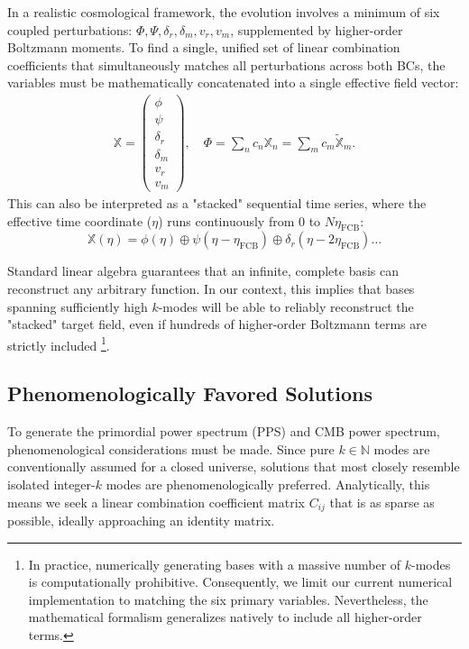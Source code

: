 In a realistic cosmological framework, the evolution involves a minimum of six coupled perturbations: $\Phi, \Psi, \delta_r, \delta_m, v_r, v_m$, supplemented by higher-order Boltzmann moments. To find a single, unified set of linear combination coefficients that simultaneously matches all perturbations across both BCs, the variables must be mathematically concatenated into a single effective field vector: 
\begin{equation}\label{eq:linear_combine_multi_fields}
\begin{aligned}
    \mathbb{X}=\begin{pmatrix}\phi\\\psi\\\delta_r\\\delta_m\\v_r\\v_m \end{pmatrix}, \quad \Phi=\sum_n c_n \mathbb{X}_n=\sum_m c_m \tilde{\mathbb{X}}_m.
\end{aligned}
\end{equation} 
This can also be interpreted as a "stacked" sequential time series, where the effective time coordinate ($\eta$) runs continuously from $0$ to $N\eta_{\text{FCB}}$:
\[ \mathbb{X}(\eta)=\phi(\eta) \oplus \psi(\eta-\eta_{\text{FCB}}) \oplus \delta_r(\eta-2\eta_{\text{FCB}}) \dots\]

Standard linear algebra guarantees that an infinite, complete basis can reconstruct any arbitrary function. In our context, this implies that bases spanning sufficiently high $k$-modes will be able to reliably reconstruct the "stacked" target field, even if hundreds of higher-order Boltzmann terms are strictly included \footnote{In practice, numerically generating bases with a massive number of $k$-modes is computationally prohibitive. Consequently, we limit our current numerical implementation to matching the six primary variables. Nevertheless, the mathematical formalism generalizes natively to include all higher-order terms.}.

\subsection{Phenomenologically Favored Solutions}

To generate the primordial power spectrum (PPS) and CMB power spectrum, phenomenological considerations must be made. Since pure $k\in \mathbb{N}$ modes are conventionally assumed for a closed universe, solutions that most closely resemble isolated integer-$k$ modes are phenomenologically preferred. Analytically, this means we seek a linear combination coefficient matrix $C_{ij}$ that is as sparse as possible, ideally approaching an identity matrix.

